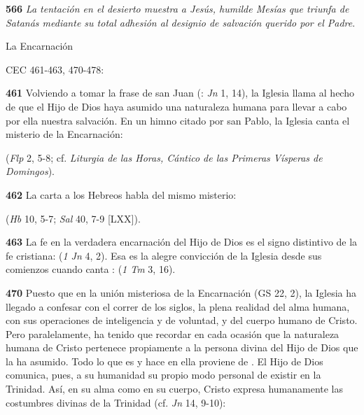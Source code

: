 \begin{body}
\begin{body}
\textbf{566} \emph{La tentación en el desierto muestra a Jesús, humilde Mesías que triunfa de Satanás mediante su total adhesión al designio de salvación querido por el Padre}.

La Encarnación

CEC 461-463, 470-478:

\textbf{461} Volviendo a tomar la frase de san Juan (: \emph{Jn} 1, 14), la Iglesia llama  al hecho de que el Hijo de Dios haya asumido una naturaleza humana para llevar a cabo por ella nuestra salvación. En un himno citado por san Pablo, la Iglesia canta el misterio de la Encarnación:

 (\emph{Flp} 2, 5-8; cf. \emph{Liturgia de las Horas, Cántico de las Primeras Vísperas de Domingos}).

\textbf{462} La carta a los Hebreos habla del mismo misterio:

 (\emph{Hb} 10, 5-7; \emph{Sal} 40, 7-9 {[}LXX{]}).

\textbf{463} La fe en la verdadera encarnación del Hijo de Dios es el signo distintivo de la fe cristiana:  (\emph{1 Jn} 4, 2). Esa es la alegre convicción de la Iglesia desde sus comienzos cuando canta :  (\emph{1 Tm} 3, 16).

\textbf{470} Puesto que en la unión misteriosa de la Encarnación  (GS 22, 2), la Iglesia ha llegado a confesar con el correr de los siglos, la plena realidad del alma humana, con sus operaciones de inteligencia y de voluntad, y del cuerpo humano de Cristo. Pero paralelamente, ha tenido que recordar en cada ocasión que la naturaleza humana de Cristo pertenece propiamente a la persona divina del Hijo de Dios que la ha asumido. Todo lo que es y hace en ella proviene de . El Hijo de Dios comunica, pues, a su humanidad su propio modo personal de existir en la Trinidad. Así, en su alma como en su cuerpo, Cristo expresa humanamente las costumbres divinas de la Trinidad (cf. \emph{Jn} 14, 9-10):


\end{body}
\end{body}
